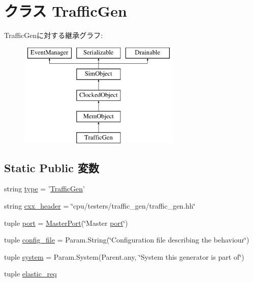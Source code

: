 \hypertarget{classTrafficGen_1_1TrafficGen}{
\section{クラス TrafficGen}
\label{classTrafficGen_1_1TrafficGen}
}
TrafficGenに対する継承グラフ:\begin{figure}[H]
\begin{center}
\leavevmode
\includegraphics[height=5cm]{classTrafficGen_1_1TrafficGen}
\end{center}
\end{figure}
\subsection*{Static Public 変数}
\begin{DoxyCompactItemize}
\item 
string \hyperlink{classTrafficGen_1_1TrafficGen_acce15679d830831b0bbe8ebc2a60b2ca}{type} = '\hyperlink{classTrafficGen_1_1TrafficGen}{TrafficGen}'
\item 
string \hyperlink{classTrafficGen_1_1TrafficGen_a17da7064bc5c518791f0c891eff05fda}{cxx\_\-header} = \char`\"{}cpu/testers/traffic\_\-gen/traffic\_\-gen.hh\char`\"{}
\item 
tuple \hyperlink{classTrafficGen_1_1TrafficGen_a1aadf525515ecfcf662c2aa51a503763}{port} = \hyperlink{classMasterPort}{MasterPort}(\char`\"{}Master \hyperlink{classTrafficGen_1_1TrafficGen_a1aadf525515ecfcf662c2aa51a503763}{port}\char`\"{})
\item 
tuple \hyperlink{classTrafficGen_1_1TrafficGen_ae6512f1802b7f1f9cc6f196a0938db60}{config\_\-file} = Param.String(\char`\"{}Configuration file describing the behaviour\char`\"{})
\item 
tuple \hyperlink{classTrafficGen_1_1TrafficGen_ab737471139f5a296e5b26e8a0e1b0744}{system} = Param.System(Parent.any, \char`\"{}System this generator is part of\char`\"{})
\item 
tuple \hyperlink{classTrafficGen_1_1TrafficGen_a9f0e1b5716040edd2da01a53330e812e}{elastic\_\-req}
\end{DoxyCompactItemize}


